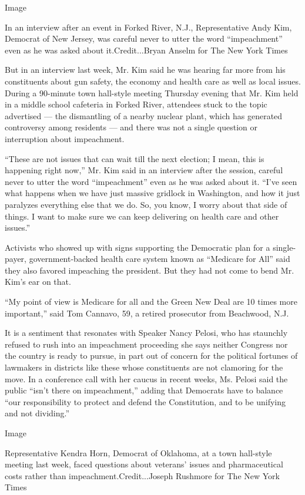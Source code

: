 Image

In an interview after an event in Forked River, N.J., Representative
Andy Kim, Democrat of New Jersey, was careful never to utter the word
``impeachment'' even as he was asked about it.Credit...Bryan Anselm for
The New York Times

But in an interview last week, Mr. Kim said he was hearing far more from
his constituents about gun safety, the economy and health care as well
as local issues. During a 90-minute town hall-style meeting Thursday
evening that Mr. Kim held in a middle school cafeteria in Forked River,
attendees stuck to the topic advertised --- the dismantling of a nearby
nuclear plant, which has generated controversy among residents --- and
there was not a single question or interruption about impeachment.

``These are not issues that can wait till the next election; I mean,
this is happening right now,'' Mr. Kim said in an interview after the
session, careful never to utter the word ``impeachment'' even as he was
asked about it. ``I've seen what happens when we have just massive
gridlock in Washington, and how it just paralyzes everything else that
we do. So, you know, I worry about that side of things. I want to make
sure we can keep delivering on health care and other issues.''

Activists who showed up with signs supporting the Democratic plan for a
single-payer, government-backed health care system known as ``Medicare
for All'' said they also favored impeaching the president. But they had
not come to bend Mr. Kim's ear on that.

``My point of view is Medicare for all and the Green New Deal are 10
times more important,'' said Tom Cannavo, 59, a retired prosecutor from
Beachwood, N.J.

It is a sentiment that resonates with Speaker Nancy Pelosi, who has
staunchly refused to rush into an impeachment proceeding she says
neither Congress nor the country is ready to pursue, in part out of
concern for the political fortunes of lawmakers in districts like these
whose constituents are not clamoring for the move. In a conference call
with her caucus in recent weeks, Ms. Pelosi said the public ``isn't
there on impeachment,'' adding that Democrats have to balance ``our
responsibility to protect and defend the Constitution, and to be
unifying and not dividing.''

Image

Representative Kendra Horn, Democrat of Oklahoma, at a town hall-style
meeting last week, faced questions about veterans' issues and
pharmaceutical costs rather than impeachment.Credit...Joseph Rushmore
for The New York Times

